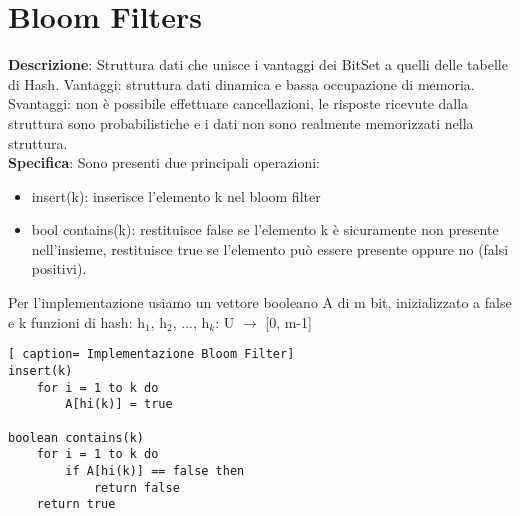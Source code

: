 \documentclass[../cheatSheetAlgoritmi.tex]{subfiles}
\begin{document}
\section{Bloom Filters}
\textbf{Descrizione}: Struttura dati che unisce i vantaggi dei BitSet a quelli delle tabelle di Hash. Vantaggi: struttura dati dinamica e bassa occupazione di memoria. Svantaggi: non è possibile effettuare cancellazioni, le risposte ricevute dalla struttura sono probabilistiche e i dati non sono realmente memorizzati nella struttura.\\
\textbf{Specifica}: Sono presenti due principali operazioni:
\begin{itemize}
 	\item insert(k): inserisce l'elemento k nel bloom filter 
 	\item bool contains(k): restituisce false se l'elemento k è sicuramente  non presente nell'insieme, restituisce true se l'elemento può essere presente oppure no (falsi positivi). 
\end{itemize}
Per l'implementazione usiamo un vettore booleano A di m bit, inizializzato a false e k funzioni di hash: h$_{1}$, h$_{2}$, ..., h$_{k}$: U $\rightarrow$ [0, m-1]\
\begin{lstlisting}[ caption= Implementazione Bloom Filter]
insert(k)
	for i = 1 to k do
		A[hi(k)] = true
		
boolean contains(k)
	for i = 1 to k do
		if A[hi(k)] == false then 
			return false
	return true
\end{lstlisting}
\end{document}

